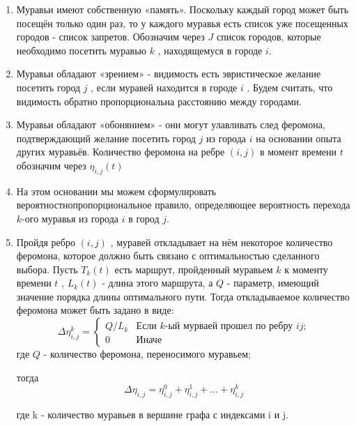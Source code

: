 \documentclass[12pt]{report}
\begin{document}
\begin{enumerate}	
	\item Муравьи имеют собственную «память». Поскольку каждый город может быть посещён только один раз, то у каждого муравья есть список уже посещенных городов - список запретов. Обозначим через $J$ список городов, которые необходимо посетить муравью $k$ , находящемуся в городе $i$. 
	
	\item Муравьи обладают «зрением» - видимость есть эвристическое желание посетить город $j$ , если муравей находится в городе $i$ . Будем считать, что видимость обратно пропорциональна расстоянию между городами. 
	
	\item Муравьи обладают «обонянием» - они могут улавливать след феромона, подтверждающий желание посетить город $j$ из города $i$ на основании опыта других муравьёв. Количество феромона на ребре $(i,j)$ в момент времени $t$ обозначим через  $\eta _{i,j} (t)$ 
	
	\item На этом основании мы можем сформулировать вероятностнопропорциональное правило, определяющее вероятность перехода $k$-ого муравья из города $i$  в город $j$. 
	 
	\item Пройдя ребро $(i,j)$ , муравей откладывает на нём некоторое количество феромона, которое должно быть связано с оптимальностью сделанного выбора. Пусть $T _{k} (t)$ есть маршрут, пройденный муравьем $k$ к моменту времени $t$ , $L _{k} (t)$ - длина этого маршрута, а $Q$ - параметр, имеющий значение порядка длины оптимального пути. Тогда откладываемое количество феромона может быть задано в виде:
	  \begin{equation}\label{form:add} 
	 	{\displaystyle \Delta \eta _{i,j}^k={\begin{cases}Q/L_{k}& {\mbox{Если $k$-ый мурваей прошел по ребру $ij$;}}\\0&{\mbox{Иначе}}\end{cases}}}
	 \end{equation}
	 где $Q$ - количество феромона, переносимого муравьем;
	 
	 тогда
	 \begin{equation}\label{form:add1} 
	 	\Delta \eta _{i,j}= \eta _{i,j}^0 + \eta _{i,j}^1 + ... + \eta _{i,j}^k 
	 \end{equation}
	 
	 где k - количество муравьев в вершине графа с индексами i и j.
\end{enumerate}
\end{document}
